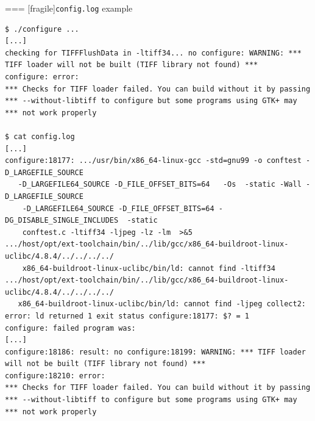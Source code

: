 === [fragile]{{\tt config.log} example}

\begin{block}{}
{\tiny
\begin{verbatim}
$ ./configure ...
[...]
checking for TIFFFlushData in -ltiff34... no configure: WARNING: *** TIFF loader will not be built (TIFF library not found) ***
configure: error: 
*** Checks for TIFF loader failed. You can build without it by passing
*** --without-libtiff to configure but some programs using GTK+ may
*** not work properly

$ cat config.log
[...]
configure:18177: .../usr/bin/x86_64-linux-gcc -std=gnu99 -o conftest -D_LARGEFILE_SOURCE
   -D_LARGEFILE64_SOURCE -D_FILE_OFFSET_BITS=64   -Os  -static -Wall -D_LARGEFILE_SOURCE
    -D_LARGEFILE64_SOURCE -D_FILE_OFFSET_BITS=64 -DG_DISABLE_SINGLE_INCLUDES  -static
    conftest.c -ltiff34 -ljpeg -lz -lm  >&5
.../host/opt/ext-toolchain/bin/../lib/gcc/x86_64-buildroot-linux-uclibc/4.8.4/../../../../
    x86_64-buildroot-linux-uclibc/bin/ld: cannot find -ltiff34
.../host/opt/ext-toolchain/bin/../lib/gcc/x86_64-buildroot-linux-uclibc/4.8.4/../../../../
   x86_64-buildroot-linux-uclibc/bin/ld: cannot find -ljpeg collect2: error: ld returned 1 exit status configure:18177: $? = 1
configure: failed program was:
[...]
configure:18186: result: no configure:18199: WARNING: *** TIFF loader will not be built (TIFF library not found) ***
configure:18210: error: 
*** Checks for TIFF loader failed. You can build without it by passing
*** --without-libtiff to configure but some programs using GTK+ may
*** not work properly
\end{verbatim}}
\end{block}



